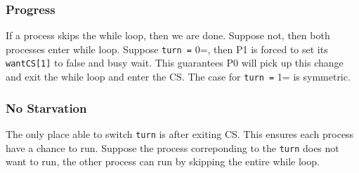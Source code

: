 \documentclass[11pt]{article}
\begin{document}
\subsubsection{Progress}
\label{sec:org37b2a44}
If a process skips the while loop, then we are done. Suppose not, then both
processes enter while loop. Suppose \texttt{turn =} 0=, then P1 is forced to set its
\texttt{wantCS[1]} to false and busy wait. This guarantees P0 will pick up this change
and exit the while loop and enter the CS. The case for \texttt{turn =} 1= is symmetric.
\subsubsection{No Starvation}
\label{sec:org1914085}
The only place able to switch \texttt{turn} is after exiting CS. This ensures each
process have a chance to run. Suppose the process correponding to the \texttt{turn}
does not want to run, the other process can run by skipping the entire while
loop.
\end{document}
